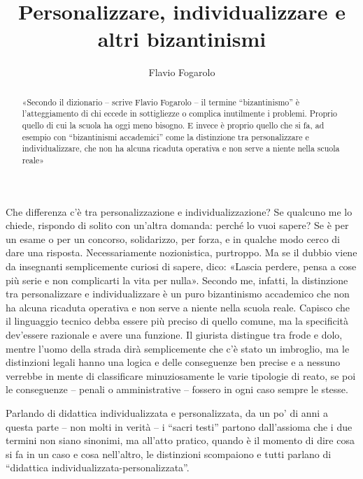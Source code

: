 \author{Flavio Fogarolo}
\title{Personalizzare, individualizzare e altri bizantinismi}
\label{cha:fogarolo030214}
\begin{abstract}
«Secondo il dizionario – scrive Flavio Fogarolo – il termine “bizantinismo” è l'atteggiamento di chi eccede in sottigliezze o complica inutilmente i problemi. Proprio quello di cui la scuola ha oggi meno bisogno. E invece è proprio quello che si fa, ad esempio con “bizantinismi accademici” come la distinzione tra personalizzare e individualizzare, che non ha alcuna ricaduta operativa e non serve a niente nella scuola reale»
\end{abstract}
\maketitle
{}

Che differenza c'è tra personalizzazione e individualizzazione? Se qualcuno me lo chiede, rispondo di solito con un'altra domanda: perché lo vuoi sapere? Se è per un esame o per un concorso, solidarizzo, per forza, e in qualche modo cerco di dare una risposta. Necessariamente nozionistica, purtroppo. Ma se il dubbio viene da insegnanti semplicemente curiosi di sapere, dico: «Lascia perdere, pensa a cose più serie e non complicarti la vita per nulla».
Secondo me, infatti, la distinzione tra personalizzare e individualizzare è un puro bizantinismo accademico che non ha alcuna ricaduta operativa e non serve a niente nella  scuola reale. Capisco che il linguaggio tecnico debba essere più preciso di quello comune, ma la specificità dev'essere razionale e avere una funzione. Il giurista distingue tra frode e dolo, mentre l'uomo della strada dirà semplicemente che c'è stato un imbroglio, ma le distinzioni legali hanno una logica e delle conseguenze ben precise e a nessuno verrebbe in mente di classificare minuziosamente le varie tipologie di reato, se poi le conseguenze – penali o amministrative – fossero in ogni caso sempre le stesse.

Parlando di didattica individualizzata e personalizzata, da un po' di anni a questa parte – non molti in verità – i “sacri testi” partono dall'assioma che i due termini non siano sinonimi, ma all'atto pratico, quando è il momento di dire cosa si fa in un caso e cosa nell'altro, le distinzioni scompaiono e tutti parlano di “didattica individualizzata-personalizzata”.

